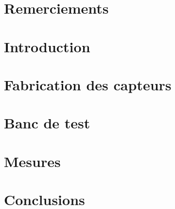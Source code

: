 \documentclass[
    iai & comatec, %
    mi, %
]{heig-tb}
\begin{document}
\maketitle
\frontmatter
\clearemptydoublepage

\preamble
\authentification

\chapter{Remerciements}


\begin{abstract}
    
\end{abstract}

\clearemptydoublepage
{
    \tableofcontents
    \let\cleardoublepage\clearpage
    \listoffigures
    \let\cleardoublepage\clearpage
    \listoftables
}

\printnomenclature
\clearemptydoublepage
{}

\label{glossaire}
\printnoidxglossary

\mainmatter
\chapter{Introduction}

%

\chapter{Fabrication des capteurs}


\chapter{Banc de test}


\chapter{Mesures}


\chapter{Conclusions}

\end{document}

